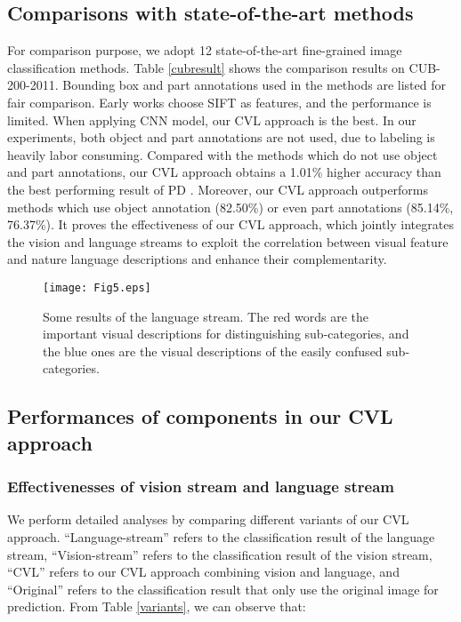 \documentclass[10pt,twocolumn,letterpaper]{article}
\begin{document}
\subsection{Comparisons with state-of-the-art methods}
For comparison purpose, we adopt 12 state-of-the-art fine-grained image classification methods. Table \ref{cubresult} shows the comparison results on CUB-200-2011. Bounding box and part annotations used in the methods are listed for fair comparison. Early works \cite{berg2013poof,xie2013hierarchical} choose SIFT \cite{lowe2004distinctive} as features, and the performance is limited. When applying CNN model, our CVL approach is the best. In our experiments, both object and part annotations are not used, due to labeling is heavily labor consuming. Compared with the methods \cite{jaderberg2015spatial,lin2015bilinear,simon2015neural,twoattention,picking} which do not use object and part annotations, our CVL approach obtains a 1.01\% higher accuracy than the best performing result of PD \cite{picking}. Moreover, our CVL approach outperforms methods which use object annotation \cite{krause2015fine} (82.50\%) or even part annotations \cite{zhangspda,zhang2014part} (85.14\%, 76.37\%). 
It proves the effectiveness of our CVL approach, which jointly integrates the vision and language streams to exploit the correlation between visual feature and nature language descriptions and enhance their complementarity.
 



\begin{figure*}[t]
\begin{center}
\texttt{[image: Fig5.eps]}
\end{center}
   \caption{Some results of the language stream. The red words are the important visual descriptions for distinguishing sub-categories, and the blue ones are the visual descriptions of the easily confused sub-categories.}
\label{visonandlanguage}
\end{figure*}

\subsection{Performances of components in our CVL approach}
\subsubsection{Effectivenesses of vision stream and language
stream}
We perform detailed analyses by comparing different variants of our CVL approach. ``Language-stream'' refers to the classification result of the language stream, ``Vision-stream'' refers to the classification result of the vision stream, ``CVL'' refers to our CVL approach combining vision and language, and ``Original'' refers to the classification result that only use the original image for prediction. From Table \ref{variants}, we can observe that:
\end{document}
